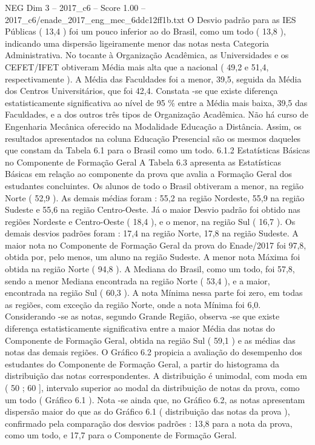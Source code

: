 \begin{textsample}{NEG Dim 3 – 2017\_c6 – Score 1.00 – 2017\_c6/enade\_2017\_eng\_mec\_6ddc12ff1b.txt}
O Desvio padrão para as IES Públicas ( 13,4 ) foi um pouco inferior ao do Brasil, como um todo ( 13,8 ), indicando uma dispersão ligeiramente menor das notas nesta Categoria Administrativa.
No tocante à Organização Acadêmica, as Universidades e os CEFET/IFET obtiveram Média mais alta que a nacional ( 49,2 e 51,4, respectivamente ).
A Média das Faculdades foi a menor, 39,5, seguida da Média dos Centros Universitários, que foi 42,4.
Constata -se que existe diferença estatisticamente significativa ao nível de 95 \% entre a Média mais baixa, 39,5 das Faculdades, e a dos outros três tipos de Organização Acadêmica.
Não há curso de Engenharia Mecânica oferecido na Modalidade Educação a Distância.
Assim, os resultados apresentados na coluna Educação Presencial são os mesmos daqueles que constam da Tabela 6.1 para o Brasil como um todo. 6.1.2 Estatísticas Básicas no Componente de Formação Geral A Tabela 6.3 apresenta as Estatísticas Básicas em relação ao componente da prova que avalia a Formação Geral dos estudantes concluintes.
Os alunos de todo o Brasil obtiveram a menor, na região Norte ( 52,9 ).
As demais médias foram : 55,2 na região Nordeste, 55,9 na região Sudeste e 55,6 na região Centro-Oeste.
Já o maior Desvio padrão foi obtido nas regiões Nordeste e Centro-Oeste ( 18,4 ), e o menor, na região Sul ( 16,7 ).
Os demais desvios padrões foram : 17,4 na região Norte, 17,8 na região Sudeste.
A maior nota no Componente de Formação Geral da prova do Enade/2017 foi 97,8, obtida por, pelo menos, um aluno na região Sudeste.
A menor nota Máxima foi obtida na região Norte ( 94,8 ).
A Mediana do Brasil, como um todo, foi 57,8, sendo a menor Mediana encontrada na região Norte ( 53,4 ), e a maior, encontrada na região Sul ( 60,3 ).
A nota Mínima nessa parte foi zero, em todas as regiões, com exceção da região Norte, onde a nota Mínima foi 6,0.
Considerando -se as notas, segundo Grande Região, observa -se que existe diferença estatisticamente significativa entre a maior Média das notas do Componente de Formação Geral, obtida na região Sul ( 59,1 ) e as médias das notas das demais regiões.
O Gráfico 6.2 propicia a avaliação do desempenho dos estudantes do Componente de Formação Geral, a partir do histograma da distribuição das notas correspondentes.
A distribuição é unimodal, com moda em ( 50 ; 60 ], intervalo superior ao modal da distribuição de notas da prova, como um todo ( Gráfico 6.1 ).
Nota -se ainda que, no Gráfico 6.2, as notas apresentam dispersão maior do que as do Gráfico 6.1 ( distribuição das notas da prova ), confirmado pela comparação dos desvios padrões : 13,8 para a nota da prova, como um todo, e 17,7 para o Componente de Formação Geral.

\end{textsample}
